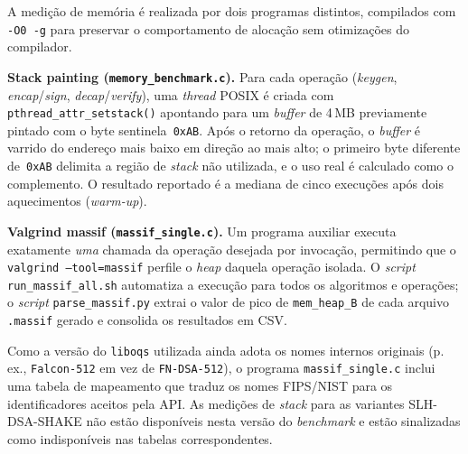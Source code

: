 A medição de memória é realizada por dois programas distintos,
compilados com \texttt{-O0 -g} para preservar o comportamento
de alocação sem otimizações do compilador.

\textbf{Stack painting (\texttt{memory\_benchmark.c}).}
Para cada operação (\textit{keygen}, \textit{encap}/\textit{sign},
\textit{decap}/\textit{verify}), uma \textit{thread} POSIX é criada
com \texttt{pthread\_attr\_setstack()} apontando para um
\textit{buffer} de 4\,MB previamente pintado com o byte
sentinela~\texttt{0xAB}.
Após o retorno da operação, o \textit{buffer} é varrido do endereço
mais baixo em direção ao mais alto; o primeiro byte diferente
de~\texttt{0xAB} delimita a região de \textit{stack} não utilizada,
e o uso real é calculado como o complemento.
O resultado reportado é a mediana de cinco execuções após dois
aquecimentos (\textit{warm-up}).

\textbf{Valgrind massif (\texttt{massif\_single.c}).}
Um programa auxiliar executa exatamente \emph{uma} chamada da
operação desejada por invocação, permitindo que o
\texttt{valgrind --tool=massif} perfile o \textit{heap} daquela
operação isolada.
O \textit{script} \texttt{run\_massif\_all.sh} automatiza a execução
para todos os algoritmos e operações; o \textit{script}
\texttt{parse\_massif.py} extrai o valor de pico de
\texttt{mem\_heap\_B} de cada arquivo \texttt{.massif} gerado e
consolida os resultados em CSV\@.

Como a versão do \texttt{liboqs} utilizada ainda adota os nomes
internos originais (p.\,ex., \texttt{Falcon-512} em vez de
\texttt{FN-DSA-512}), o programa \texttt{massif\_single.c} inclui
uma tabela de mapeamento que traduz os nomes FIPS/NIST para os
identificadores aceitos pela API\@.
As medições de \textit{stack} para as variantes
SLH-DSA-SHAKE não estão disponíveis nesta versão do
\textit{benchmark} e estão sinalizadas como indisponíveis nas
tabelas correspondentes.


%
%
%
%
%
%


